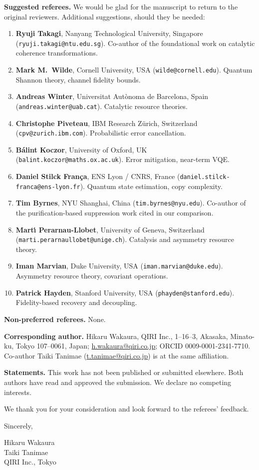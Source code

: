 \documentclass[11pt,a4paper]{article}
\begin{document}
\textbf{Suggested referees.}
We would be glad for the manuscript to return to the original reviewers.
Additional suggestions, should they be needed:
\begin{enumerate}
\item \textbf{Ryuji Takagi}, Nanyang Technological University, Singapore (\texttt{ryuji.takagi@ntu.edu.sg}). Co-author of the foundational work on catalytic coherence transformations.
\item \textbf{Mark M.\ Wilde}, Cornell University, USA (\texttt{wilde@cornell.edu}). Quantum Shannon theory, channel fidelity bounds.
\item \textbf{Andreas Winter}, Universitat Aut\`{o}noma de Barcelona, Spain (\texttt{andreas.winter@uab.cat}). Catalytic resource theories.
\item \textbf{Christophe Piveteau}, IBM Research Z\"{u}rich, Switzerland (\texttt{cpv@zurich.ibm.com}). Probabilistic error cancellation.
\item \textbf{B\'{a}lint Koczor}, University of Oxford, UK (\texttt{balint.koczor@maths.ox.ac.uk}). Error mitigation, near-term VQE.
\item \textbf{Daniel Stilck Fran\c{c}a}, ENS Lyon / CNRS, France (\texttt{daniel.stilck-franca@ens-lyon.fr}). Quantum state estimation, copy complexity.
\item \textbf{Tim Byrnes}, NYU Shanghai, China (\texttt{tim.byrnes@nyu.edu}). Co-author of the purification-based suppression work cited in our comparison.
\item \textbf{Mart\'{\i} Perarnau-Llobet}, University of Geneva, Switzerland (\texttt{marti.perarnaullobet@unige.ch}). Catalysis and asymmetry resource theory.
\item \textbf{Iman Marvian}, Duke University, USA (\texttt{iman.marvian@duke.edu}). Asymmetry resource theory, covariant operations.
\item \textbf{Patrick Hayden}, Stanford University, USA (\texttt{phayden@stanford.edu}). Fidelity-based recovery and decoupling.
\end{enumerate}

\textbf{Non-preferred referees.} None.

\medskip

\textbf{Corresponding author.}
Hikaru Wakaura, QIRI Inc., 1--16--3, Akasaka, Minato-ku, Tokyo 107--0061, Japan;
\href{mailto:h.wakaura@qiri.co.jp}{h.wakaura@qiri.co.jp}; ORCID 0009-0001-2341-7710.
Co-author Taiki Tanimae (\href{mailto:t.tanimae@qiri.co.jp}{t.tanimae@qiri.co.jp}) is at the same affiliation.

\textbf{Statements.}
This work has not been published or submitted elsewhere.
Both authors have read and approved the submission.
We declare no competing interests.

\medskip

We thank you for your consideration and look forward to the referees' feedback.

\vspace{0.6cm}
Sincerely,

\vspace{0.5cm}
Hikaru Wakaura\\
Taiki Tanimae\\
QIRI Inc., Tokyo
\end{document}
